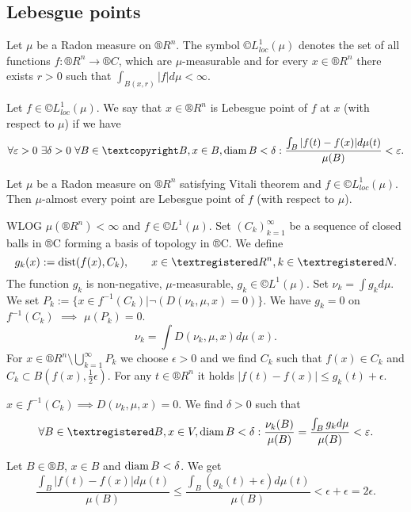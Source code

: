 \documentclass[12pt]{article}					%
\begin{document}

\subsection{Lebesgue points}
\begin{definice}[$©L_{loc}^1$]
	Let $\mu$ be a Radon measure on $®R^n$. The symbol $©L_{loc}^1(\mu)$ denotes the set of all functions $f: ®R^n \rightarrow ®C$, which are $\mu$-measurable and for every $x \in ®R^n$ there exists $r > 0$ such that $\int_{B(x, r)} |f| d\mu < ∞$.
\end{definice}

\begin{definice}
	Let $f \in ©L_{loc}^1(\mu)$. We say that $x \in ®R^n$ is Lebesgue point of $f$ at $x$ (with respect to $\mu$) if we have
	$$ \forall \epsilon > 0\ \exists \delta > 0\ \forall B \in ©B, x \in B, \diam B < \delta: \frac{\int_B |f(t) - f(x)| d\mu(t)}{\mu(B)} < \epsilon. $$
\end{definice}

\begin{veta}
	Let $\mu$ be a Radon measure on $®R^n$ satisfying Vitali theorem and $f \in ©L_{loc}^1(\mu)$. Then $\mu$-almost every point are Lebesgue point of $f$ (with respect to $\mu$).

	\begin{dukazin}
		WLOG $\mu(®R^n) < ∞$ and $f \in ©L^1(\mu)$. Set $(C_k)_{k=1}^∞$ be a sequence of closed balls in ®C forming a basis of topology in ®C. We define
		$$ g_k(x) := \dist(f(x), C_k), \qquad x \in ®R^n, k \in ®N. $$
		The function $g_k$ is non-negative, $\mu$-measurable, $g_k \in ©L^1(\mu)$. Set $\nu_k = \int g_k d\mu$. We set $P_k := \{x \in f^{-1}(C_k) | \neg(D(\nu_k, \mu, x) = 0)\}$. We have $g_k = 0$ on $f^{-1}(C_k)$ $\implies$ $\mu(P_k) = 0$.
		$$ \nu_k = \int D(\nu_k, \mu, x) d\mu(x). $$
		For $x \in ®R^n \setminus \bigcup_{k=1}^∞ P_k$ we choose $\epsilon > 0$ and we find $C_k$ such that $f(x) \in C_k$ and $C_k \subset B(f(x), \frac{1}{2} \epsilon)$. For any $t \in ®R^n$ it holds $|f(t) - f(x)| ≤ g_k(t) + \epsilon$.

		$x \in f^{-1}(C_k) \implies D(\nu_k, \mu, x) = 0$. We find $\delta > 0$ such that
		$$ \forall B \in ®B, x \in V, \diam B < \delta: \frac{\nu_k(B)}{\mu(B)} = \frac{\int_B g_k d\mu}{\mu(B)} < \epsilon. $$

		Let $B \in ®B$, $x \in B$ and $\operatorname{diam} B < \delta$. We get
		$$ \frac{\int_B |f(t) - f(x)| d\mu(t)}{\mu(B)} ≤ \frac{\int_B (g_k(t) + \epsilon) d\mu(t)}{\mu(B)} < \epsilon + \epsilon = 2\epsilon. $$
	\end{dukazin}
\end{veta}
\end{document}

